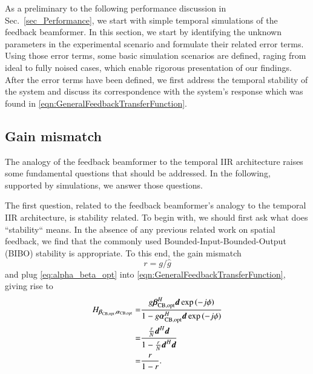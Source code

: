 As a preliminary to the following performance discussion in Sec.~\ref{sec_Performance}, we start with simple temporal simulations of the feedback beamformer.
In this section, we start by identifying the unknown parameters in the experimental scenario and formulate their related error terms.
Using those error terms, some basic simulation scenarios are defined, raging from ideal to fully noised cases, which enable rigorous presentation of our findings.
After the error terms have been defined, we first address the temporal stability of the system and discuss its correspondence with the system's response which was found in \eqref{eqn:GeneralFeedbackTransferFunction}.
\subsection{Gain mismatch}
The analogy of the feedback beamformer to the temporal IIR architecture raises some fundamental questions that should be addressed.
In the following, supported by simulations, we answer those questions.
\par The first question, related to the feedback beamformer's analogy to the temporal IIR architecture, is stability related.
To begin with, we should first ask what does ``stability`` means.
In the absence of any previous related work on spatial feedback, we find that the commonly used Bounded-Input-Bounded-Output (BIBO) stability is appropriate. 
To this end, the gain mismatch
\begin{equation}
    r=g/\hat{g}
\end{equation}
and plug \eqref{eq:alpha_beta_opt} into \eqref{eqn:GeneralFeedbackTransferFunction}, giving rise to
\begin{equation}\label{eq:SF_CB_gainMismatch}
    {
        \begin{split}
            H_{\boldsymbol{\beta}_{\text{CB,opt}},\boldsymbol{\alpha}_{\text{CB,opt}}}
            = &\frac{
            g\boldsymbol{\beta}_{\text{CB,opt}}^{H}\boldsymbol{d}\exp{\left({-j\phi}\right)}
            }{
            1 - g\boldsymbol{\alpha}_{\text{CB,opt}}^{H}\boldsymbol{d}\exp{\left({-j\phi}\right)}
            }\\
            = &\frac{    
            \frac{r}{N}\boldsymbol{d}^{H}\boldsymbol{d}
            }{
            1 - \frac{r}{N}\boldsymbol{d}^{H}\boldsymbol{d}
            }\\
            = & \frac{r}{1-r}.
        \end{split}
    }
\end{equation}
